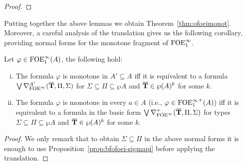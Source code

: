\begin{proof}
\end{proof}

Putting together the above lemmas we obtain Theorem~\ref{thm:ofoeimonot}. Moreover, a careful analysis of the translation gives us the following corollary, providing normal forms for the monotone fragment of $\ofoei$.

\begin{corollary}\label{cor:ofoeipositivenf}
	Let $\varphi \in \ofoei(A)$, the following hold:
	\begin{enumerate}[(i)]
		\item The formula $\varphi$ is monotone in $A' \subseteq A$ iff it is equivalent to a formula $\bigvee \mondbnfofoei{\vlist{T}}{\Pi}{\Sigma}{A'}$ for $\Sigma\subseteq\Pi \subseteq \wp A$ and $\vlist{T} \in \wp(A)^k$ for some $k$.
		\item The formula $\varphi$ is monotone in every $a\in A$ (i.e., $\varphi\in{\ofoei}^+(A)$) iff it is equivalent to a formula in the basic form $\bigvee \posdbnfofoei{\vlist{T}}{\Pi}{\Sigma}$ for types $\Sigma\subseteq\Pi \subseteq \wp A$ and $\vlist{T} \in \wp(A)^k$ for some $k$.
	\end{enumerate}
\end{corollary}
\begin{proof}
	We only remark that to obtain $\Sigma\subseteq\Pi$ in the above normal forms it is enough to use Proposition~\ref{prop:bfofoei-sigmapi} before applying the translation.
\end{proof}

